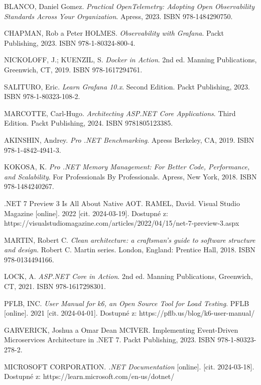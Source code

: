 \documentclass[a4paper,12pt]{article}
\begin{document}
{%
BLANCO, Daniel Gomez. \emph{Practical OpenTelemetry: Adopting Open Observability Standards Across Your Organization}. Apress, 2023. ISBN 978-1484290750.

CHAPMAN, Rob a Peter HOLMES. \emph{Observability with Grafana}. Packt Publishing, 2023. ISBN 978-1-80324-800-4.

NICKOLOFF, J.; KUENZIL, S. \emph{Docker in Action}. 2nd ed. Manning Publications, Greenwich, CT, 2019. ISBN 978-1617294761.

SALITURO, Eric. \emph{Learn Grafana 10.x}. Second Edition. Packt Publishing, 2023. ISBN 978-1-80323-108-2.

MARCOTTE, Carl-Hugo. \emph{Architecting ASP.NET Core Applications}. Third Edition. Packt Publishing, 2024. ISBN 9781805123385.

AKINSHIN, Andrey. \emph{Pro .NET Benchmarking}. Apress Berkeley, CA, 2019. ISBN 978-1-4842-4941-3.

KOKOSA, K. \emph{Pro .NET Memory Management: For Better Code, Performance, and Scalability}. For Professionals By Professionals. Apress, New York, 2018. ISBN 978-1484240267.

.NET 7 Preview 3 Is All About Native AOT. RAMEL, David. Visual Studio Magazine [online]. 2022 [cit. 2024-03-19]. Dostupné z: https://visualstudiomagazine.com/articles/2022/04/15/net-7-preview-3.aspx

MARTIN, Robert C. \emph{Clean architecture: a craftsman's guide to software structure and design}. Robert C. Martin series. London, England: Prentice Hall, 2018. ISBN 978-0134494166.

LOCK, A. \emph{ASP.NET Core in Action}. 2nd ed. Manning Publications, Greenwich, CT, 2021. ISBN 978-1617298301.

PFLB, INC. \emph{User Manual for k6, an Open Source Tool for Load Testing}. PFLB [online]. 2021 [cit. 2024-04-01]. Dostupné z: https://pflb.us/blog/k6-user-manual/

GARVERICK, Joshua a Omar Dean MCIVER. Implementing Event-Driven Microservices Architecture in .NET 7. Packt Publishing, 2023. ISBN 978-1-80323-278-2.

MICROSOFT CORPORATION. \emph{.NET Documentation} [online]. [cit. 2024-03-18]. Dostupné z: https://learn.microsoft.com/en-us/dotnet/

}
\end{document}
